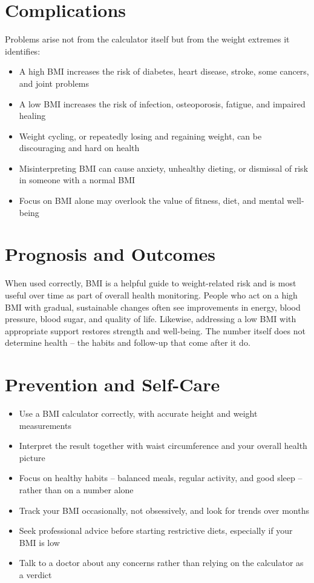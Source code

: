 \section*{Complications}
Problems arise not from the calculator itself but from the weight extremes it identifies:

\begin{itemize}
    \item A high BMI increases the risk of diabetes, heart disease, stroke, some cancers, and joint problems
    \item A low BMI increases the risk of infection, osteoporosis, fatigue, and impaired healing
    \item Weight cycling, or repeatedly losing and regaining weight, can be discouraging and hard on health
    \item Misinterpreting BMI can cause anxiety, unhealthy dieting, or dismissal of risk in someone with a normal BMI
    \item Focus on BMI alone may overlook the value of fitness, diet, and mental well-being
\end{itemize}

\section*{Prognosis and Outcomes}
When used correctly, BMI is a helpful guide to weight-related risk and is most useful over time as part of overall health monitoring. People who act on a high BMI with gradual, sustainable changes often see improvements in energy, blood pressure, blood sugar, and quality of life. Likewise, addressing a low BMI with appropriate support restores strength and well-being. The number itself does not determine health -- the habits and follow-up that come after it do.

\section*{Prevention and Self-Care}
\begin{itemize}
    \item Use a BMI calculator correctly, with accurate height and weight measurements
    \item Interpret the result together with waist circumference and your overall health picture
    \item Focus on healthy habits -- balanced meals, regular activity, and good sleep -- rather than on a number alone
    \item Track your BMI occasionally, not obsessively, and look for trends over months
    \item Seek professional advice before starting restrictive diets, especially if your BMI is low
    \item Talk to a doctor about any concerns rather than relying on the calculator as a verdict
\end{itemize}

